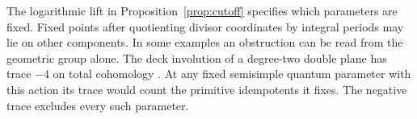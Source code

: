 The logarithmic lift in Proposition~\ref{prop:cutoff} specifies which parameters are fixed. Fixed points after quotienting divisor coordinates by integral periods may lie on other components. In some examples an obstruction can be read from the geometric group alone. The deck involution of a degree-two double plane has trace $-4$ on total cohomology \cite[Example~2.5]{CT}. At any fixed semisimple quantum parameter with this action its trace would count the primitive idempotents it fixes. The negative trace excludes every such parameter.
